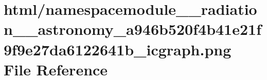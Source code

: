 \hypertarget{namespacemodule____radiation____astronomy__a946b520f4b41e21f9f9e27da6122641b__icgraph_8png}{}\section{html/namespacemodule\+\_\+\+\_\+radiation\+\_\+\+\_\+astronomy\+\_\+a946b520f4b41e21f9f9e27da6122641b\+\_\+icgraph.png File Reference}
\label{namespacemodule____radiation____astronomy__a946b520f4b41e21f9f9e27da6122641b__icgraph_8png}
